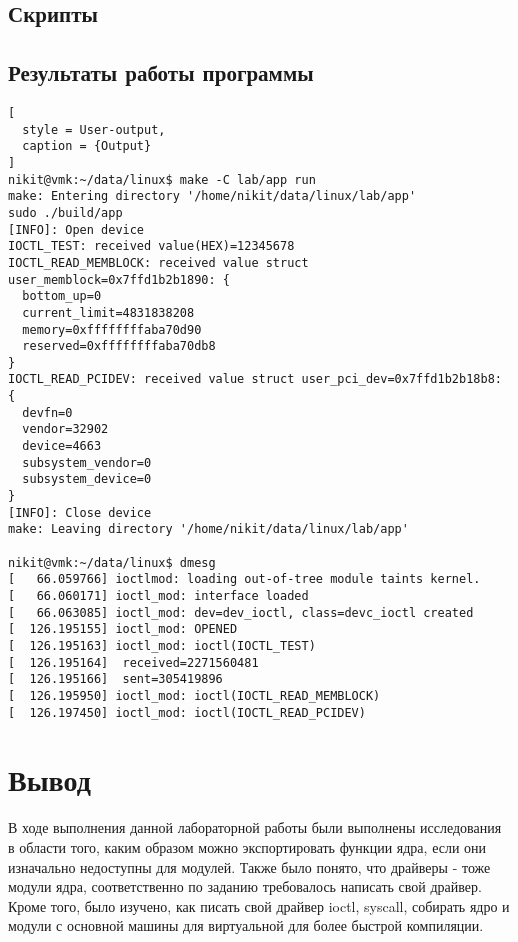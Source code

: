 \documentclass[11pt, a4paper]{article}
\begin{document}


\subsection{Скрипты}









\subsection{Результаты работы программы}

\begin{lstlisting}[
  style = User-output,
  caption = {Output}
]
nikit@vmk:~/data/linux$ make -C lab/app run
make: Entering directory '/home/nikit/data/linux/lab/app'
sudo ./build/app
[INFO]: Open device
IOCTL_TEST: received value(HEX)=12345678
IOCTL_READ_MEMBLOCK: received value struct user_memblock=0x7ffd1b2b1890: {
  bottom_up=0
  current_limit=4831838208
  memory=0xffffffffaba70d90
  reserved=0xffffffffaba70db8
}
IOCTL_READ_PCIDEV: received value struct user_pci_dev=0x7ffd1b2b18b8: {
  devfn=0
  vendor=32902
  device=4663
  subsystem_vendor=0
  subsystem_device=0
}
[INFO]: Close device
make: Leaving directory '/home/nikit/data/linux/lab/app'

nikit@vmk:~/data/linux$ dmesg
[   66.059766] ioctlmod: loading out-of-tree module taints kernel.
[   66.060171] ioctl_mod: interface loaded
[   66.063085] ioctl_mod: dev=dev_ioctl, class=devc_ioctl created
[  126.195155] ioctl_mod: OPENED
[  126.195163] ioctl_mod: ioctl(IOCTL_TEST)
[  126.195164]  received=2271560481
[  126.195166]  sent=305419896
[  126.195950] ioctl_mod: ioctl(IOCTL_READ_MEMBLOCK)
[  126.197450] ioctl_mod: ioctl(IOCTL_READ_PCIDEV)
\end{lstlisting}

\section{Вывод}
В ходе выполнения данной лабораторной работы были выполнены исследования в области того, каким образом можно экспортировать функции ядра, если они изначально недоступны для модулей. Также было понято, что драйверы - тоже модули ядра, соответственно по заданию требовалось написать свой драйвер.
Кроме того, было изучено, как писать свой драйвер ioctl, syscall, собирать ядро и модули с основной машины для виртуальной для более быстрой компиляции.
\end{document}
